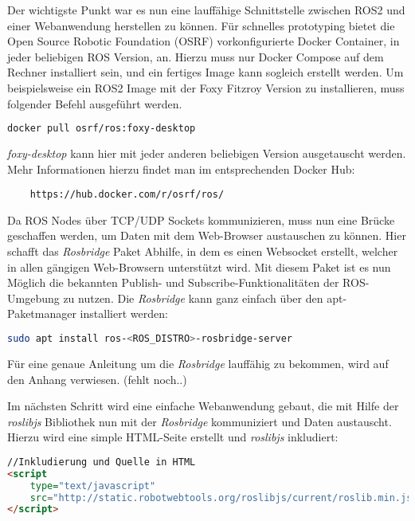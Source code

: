 \begin{flushleft}

Der wichtigste Punkt war es nun eine lauffähige Schnittstelle zwischen ROS2 und einer Webanwendung herstellen zu können. Für schnelles prototyping bietet die Open Source Robotic Foundation (OSRF) vorkonfigurierte Docker Container, in jeder beliebigen ROS Version, an. Hierzu muss nur Docker Compose auf dem Rechner installiert sein, und ein fertiges Image kann sogleich erstellt werden. Um beispielsweise ein ROS2 Image mit der Foxy Fitzroy Version zu installieren, muss folgender Befehl ausgeführt werden. 
\begin{lstlisting}[language=bash]
    docker pull osrf/ros:foxy-desktop 
\end{lstlisting}

\textit{foxy-desktop} kann hier mit jeder anderen beliebigen Version ausgetauscht werden. Mehr Informationen hierzu findet man im entsprechenden Docker Hub: 
\begin{lstlisting}
    https://hub.docker.com/r/osrf/ros/
\end{lstlisting}

Da ROS Nodes über TCP/UDP Sockets kommunizieren, muss nun eine Brücke geschaffen werden, um Daten mit dem Web-Browser austauschen zu können. Hier schafft das \textit{Rosbridge} Paket Abhilfe, in dem es einen Websocket erstellt, welcher in allen gängigen Web-Browsern unterstützt wird. Mit diesem Paket ist es nun Möglich die bekannten Publish- und Subscribe-Funktionalitäten der ROS-Umgebung zu nutzen. Die \textit{Rosbridge} kann ganz einfach über den apt-Paketmanager installiert werden:

\begin{lstlisting}[language=bash]
    sudo apt install ros-<ROS_DISTRO>-rosbridge-server 
\end{lstlisting}

Für eine genaue Anleitung um die \textit{Rosbridge} lauffähig zu bekommen, wird auf den Anhang verwiesen. (fehlt noch..) 

Im nächsten Schritt wird eine einfache Webanwendung gebaut, die mit Hilfe der \textit{roslibjs} Bibliothek nun mit der \textit{Rosbridge} kommuniziert und Daten austauscht. 
Hierzu wird eine simple HTML-Seite erstellt und \textit{roslibjs} inkludiert:

\begin{lstlisting}[language=html]
//Inkludierung und Quelle in HTML
<script 
    type="text/javascript" 
    src="http://static.robotwebtools.org/roslibjs/current/roslib.min.js">
</script> 



\end{lstlisting}
\end{flushleft}
